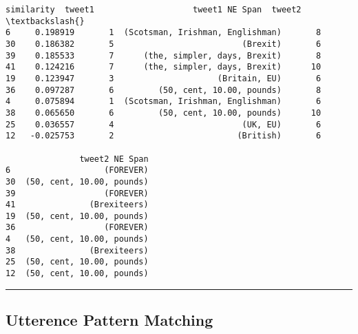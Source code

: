 \documentclass[11pt]{article}
\makeatletter
\newcommand{\boxspacing}{\kern\kvtcb@left@rule\kern\kvtcb@boxsep}
\newcommand{\prompt}[4]{
        {\ttfamily\llap{{\color{#2}[#3]:\hspace{3pt}#4}}\vspace{-\baselineskip}}
    }
\makeatother
\begin{document}
            \begin{tcolorbox}[breakable, size=fbox, boxrule=.5pt, pad at break*=1mm, opacityfill=0]
\prompt{Out}{outcolor}{11}{\boxspacing}
\begin{Verbatim}[commandchars=\\\{\}]
    similarity  tweet1                    tweet1 NE Span  tweet2  \textbackslash{}
6     0.198919       1  (Scotsman, Irishman, Englishman)       8
30    0.186382       5                          (Brexit)       6
39    0.185533       7      (the, simpler, days, Brexit)       8
41    0.124216       7      (the, simpler, days, Brexit)      10
19    0.123947       3                     (Britain, EU)       6
36    0.097287       6         (50, cent, 10.00, pounds)       8
4     0.075894       1  (Scotsman, Irishman, Englishman)       6
38    0.065650       6         (50, cent, 10.00, pounds)      10
25    0.036557       4                          (UK, EU)       6
12   -0.025753       2                         (British)       6

               tweet2 NE Span
6                   (FOREVER)
30  (50, cent, 10.00, pounds)
39                  (FOREVER)
41               (Brexiteers)
19  (50, cent, 10.00, pounds)
36                  (FOREVER)
4   (50, cent, 10.00, pounds)
38               (Brexiteers)
25  (50, cent, 10.00, pounds)
12  (50, cent, 10.00, pounds)
\end{Verbatim}
\end{tcolorbox}
        
    \begin{center}\rule{0.5\linewidth}{0.5pt}\end{center}

    \hypertarget{utterence-pattern-matching}{%
\subsection{Utterence Pattern
Matching}\label{utterence-pattern-matching}}
\end{document}
